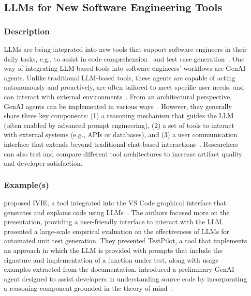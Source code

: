 
\subsection{LLMs for New Software Engineering Tools}
\label{sec:llms-for-new-software-engineering-tools}

\subsubsection{Description}

LLMs are being integrated into new tools that support software engineers in their daily tasks, e.g., to assist in code comprehension~\cite{DBLP:conf/chi/YanHWH24} and test case generation~\cite{DBLP:journals/tse/SchaferNET24}.
One way of integrating LLM-based tools into software engineers' workflows are GenAI agents.
Unlike traditional LLM-based tools, these agents are capable of acting autonomously and proactively, are often tailored to meet specific user needs, and can interact with external environments~\cite{takerngsaksiri2024human,wiesinger2025agents}.
From an architectural perspective, GenAI agents can be implemented in various ways~\cite{wiesinger2025agents}.
However, they generally share three key components: (1) a reasoning mechanism that guides the LLM (often enabled by advanced prompt engineering), (2) a set of tools to interact with external systems (e.g., APIs or databases), and (3) a user communication interface that extends beyond traditional chat-based interactions~\cite{DBLP:conf/icsm/RichardsW24, DBLP:journals/tmlr/SumersYN024, DBLP:journals/corr/abs-2309-07870}.
Researchers can also test and compare different tool architectures to increase artifact quality and developer satisfaction.

\subsubsection{Example(s)}

\citeauthor{DBLP:conf/chi/YanHWH24} proposed IVIE, a tool integrated into the VS Code graphical interface that generates and explains code using LLMs~\cite{DBLP:conf/chi/YanHWH24}.
The authors focused more on the presentation, providing a user-friendly interface to interact with the LLM. 
\citeauthor{DBLP:journals/tse/SchaferNET24}~\cite{DBLP:journals/tse/SchaferNET24} presented a large-scale empirical evaluation on the effectiveness of LLMs for automated unit test generation.
They presented TestPilot, a tool that implements an approach in which the LLM is provided with prompts that include the signature and implementation of a function under test, along with usage examples extracted from the documentation.
\citeauthor{DBLP:conf/icsm/RichardsW24} introduced a preliminary GenAI agent designed to assist developers in understanding source code by incorporating a reasoning component grounded in the theory of mind~\cite{DBLP:conf/icsm/RichardsW24}.

